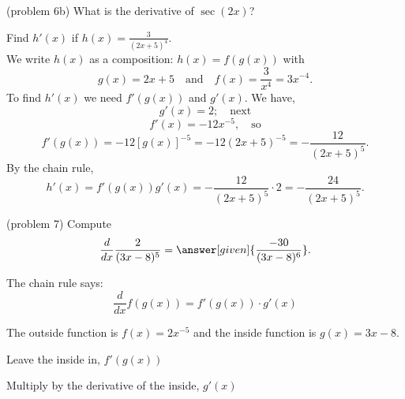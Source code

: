 \documentclass{ximera}
\begin{document}
\begin{question}(problem 6b)
What is the derivative of $\sec(2x)$?
\begin{multipleChoice}
\end{multipleChoice}
\end{question}



\begin{example}[example 7]
Find $h'(x)$ if $h(x) = \frac{3}{(2x + 5)^4}$.\\
We write $h(x)$ as a composition: $h(x)=f(g(x))$ with 
\[
g(x) = 2x+ 5  \quad \text{and} \quad  f(x) = \frac{3}{x^4} = 3x^{-4}.
\]
 To find $h'(x)$ we need $f'(g(x))$ and $g'(x)$.  We have,
\[g'(x) = 2; \quad \text{next}\]
\[f'(x) = -12x^{-5}, \quad \text{so}\]
\[f'(g(x)) = -12[g(x)]^{-5} = -12(2x+5)^{-5} = -\frac{12}{(2x+5)^5}.\]
By the chain rule,
\[h'(x) = f'(g(x))g'(x) = -\frac{12}{(2x+5)^5}\cdot 2 = -\frac{24}{(2x+5)^5}.\]
\end{example}

\begin{center}
\begin{foldable}
\end{foldable}
\end{center}



\begin{problem}(problem 7)
  Compute
  \[
  \frac{d}{dx} \frac{2}{(3x - 8)^5} = \answer[given]{\frac{-30}{(3x - 8)^6}}.
  \]
  
    \begin{hint}
      The chain rule says:
      \[
      \frac{d}{dx} f(g(x)) = f'(g(x))\cdot g'(x)
      \]
    \end{hint}
    \begin{hint}
      The outside function is $f(x) = 2x^{-5}$ and the inside
      function is $g(x) = 3x - 8$.
    \end{hint}
    
    \begin{hint}
		  Leave the inside in, $f'(g(x))$
		\end{hint}
		\begin{hint}
		  Multiply by the derivative of the inside, $g'(x)$
		\end{hint}
    
\end{problem}
\end{document}
